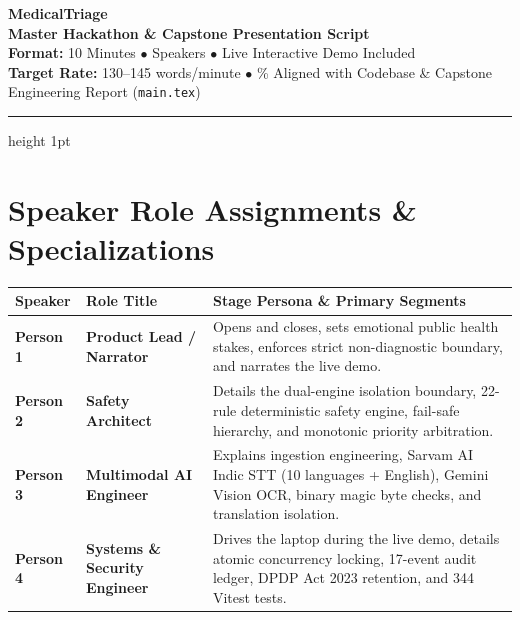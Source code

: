 \documentclass[11pt,a4paper]{article}
\begin{document}
\begin{center}
  {\Huge \textbf{\color{PrimaryTeal}MedicalTriage}}\\[3mm]
  {\Large \textbf{Master Hackathon \& Capstone Presentation Script}}\\[4mm]
  {\small \textbf{Format:} 10 Minutes \quad $\bullet$  Speakers \quad $\bullet$ \quad Live Interactive Demo Included}\\[2mm]
  {\footnotesize \color{MutedGray}\textbf{Target Rate:} 130--145 words/minute \quad $\bullet$ \% Aligned with Codebase \& Capstone Engineering Report (\texttt{main.tex})}
\end{center}

\vspace{3mm}
\hrule height 1pt
\vspace{6mm}

\section*{Speaker Role Assignments \& Specializations}

\begin{table}[htbp]
  \centering
  \small
  \begin{tabularx}{\textwidth}{p{2.6cm}p{3.8cm}X}
    \toprule
    \textbf{Speaker} & \textbf{Role Title} & \textbf{Stage Persona \& Primary Segments} \\
    \midrule
    \textbf{Person 1} & \textbf{Product Lead / Narrator} & Opens and closes, sets emotional public health stakes, enforces strict non-diagnostic boundary, and narrates the live demo. \\
    \addlinespace
    \textbf{Person 2} & \textbf{Safety Architect} & Details the dual-engine isolation boundary, 22-rule deterministic safety engine, fail-safe hierarchy, and monotonic priority arbitration. \\
    \addlinespace
    \textbf{Person 3} & \textbf{Multimodal AI Engineer} & Explains ingestion engineering, Sarvam AI Indic STT (10 languages + English), Gemini Vision OCR, binary magic byte checks, and translation isolation. \\
    \addlinespace
    \textbf{Person 4} & \textbf{Systems \& Security Engineer} & Drives the laptop during the live demo, details atomic concurrency locking, 17-event audit ledger, DPDP Act 2023 retention, and 344 Vitest tests. \\
    \bottomrule
  \end{tabularx}
\end{table}
\end{document}
